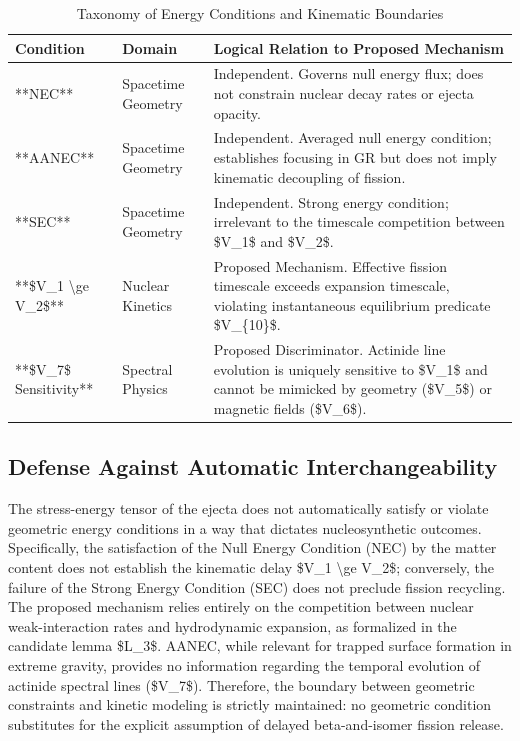 \documentclass[conference]{IEEEtran}
\begin{document}
\begin{table}[htbp]
\centering
\footnotesize
\setlength{\tabcolsep}{3pt}
\renewcommand{\arraystretch}{1.12}
\caption{Taxonomy of Energy Conditions and Kinematic Boundaries}
\label{tab:appendix-variables-and-definitions-B2}
\begin{tabular}{|p{}|p{}|p{}|}
\hline
Condition & Domain & Logical Relation to Proposed Mechanism \\\hline
**NEC** & Spacetime Geometry & Independent. Governs null energy flux; does not constrain nuclear decay rates or ejecta opacity. \\\hline
**AANEC** & Spacetime Geometry & Independent. Averaged null energy condition; establishes focusing in GR but does not imply kinematic decoupling of fission. \\\hline
**SEC** & Spacetime Geometry & Independent. Strong energy condition; irrelevant to the timescale competition between \$V\_1\$ and \$V\_2\$. \\\hline
**\$V\_1 \textbackslash{}ge V\_2\$** & Nuclear Kinetics & Proposed Mechanism. Effective fission timescale exceeds expansion timescale, violating instantaneous equilibrium predicate \$V\_\{10\}\$. \\\hline
**\$V\_7\$ Sensitivity** & Spectral Physics & Proposed Discriminator. Actinide line evolution is uniquely sensitive to \$V\_1\$ and cannot be mimicked by geometry (\$V\_5\$) or magnetic fields (\$V\_6\$). \\\hline
\end{tabular}
\end{table}

\subsection{Defense Against Automatic Interchangeability}
The stress-energy tensor of the ejecta does not automatically satisfy or violate geometric energy conditions in a way that dictates nucleosynthetic outcomes. Specifically, the satisfaction of the Null Energy Condition (NEC) by the matter content does not establish the kinematic delay \$V\_1 \textbackslash{}ge V\_2\$; conversely, the failure of the Strong Energy Condition (SEC) does not preclude fission recycling. The proposed mechanism relies entirely on the competition between nuclear weak-interaction rates and hydrodynamic expansion, as formalized in the candidate lemma \$L\_3\$. AANEC, while relevant for trapped surface formation in extreme gravity, provides no information regarding the temporal evolution of actinide spectral lines (\$V\_7\$). Therefore, the boundary between geometric constraints and kinetic modeling is strictly maintained: no geometric condition substitutes for the explicit assumption of delayed beta-and-isomer fission release.
\end{document}
